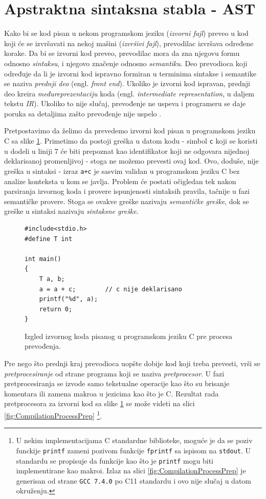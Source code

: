 \section{Apstraktna sintaksna stabla - AST}
\label{sec:AST}

Kako bi se kod pisan u nekom programskom jeziku (\emph{izvorni fajl}) preveo u kod koji će se izvršavati na nekoj mašini (\emph{izvršivi fajl}), prevodilac izvršava određene korake. Da bi se izvorni kod preveo, prevodilac mora da zna njegovu formu odnosno \emph{sintaksu}, i njegovo značenje odnosno \emph{semantiku}. Deo prevodioca koji određuje da li je izvorni kod ispravno formiran u terminima sintakse i semantike se naziva \emph{prednji deo} (engl. \emph{front end}). Ukoliko je izvorni kod ispravan, prednji deo kreira \emph{međureprezentaciju} koda (engl. \emph{intermediate representation}, u daljem tekstu \emph{IR}). Ukoliko to nije slučaj, prevođenje ne uspeva i programeru se daje poruka sa detaljima zašto prevođenje nije uspelo \cite{EngineeringCompilers}.

Pretpostavimo da želimo da prevedemo izvorni kod pisan u programskom jeziku C sa slike \ref{fig:CompilationProcessInit}. Primetimo da postoji greška u datom kodu - simbol \texttt{c} koji se koristi u dodeli u liniji $7$ će biti prepoznat kao identifikator koji ne odgovara nijednoj deklarisanoj promenljivoj - stoga ne možemo prevesti ovaj kod. Ovo, doduše, nije greška u sintaksi - izraz \texttt{a+c} je sasvim validan u programskom jeziku C bez analize konteksta u kom se javlja. Problem će postati očigledan tek nakon parsiranja izvornog koda i provere ispunjenosti sintaksih pravila, tačnije u fazi semantičke provere. Stoga se ovakve greške nazivaju \emph{semantičke greške}, dok se greške u sintaksi nazivaju \emph{sintaksne greške}.

\begin{figure}[h!]
\begin{lstlisting}
#include<stdio.h>
#define T int

int main()
{
    T a, b;
    a = a + c;        // c nije deklarisano
    printf("%d", a);
    return 0;
}
\end{lstlisting}
\caption{Izgled izvornog koda pisanog u programskom jeziku C pre procesa prevođenja.}
\label{fig:CompilationProcessInit}
\end{figure}

Pre nego što prednji kraj prevodioca uopšte dobije kod koji treba prevesti, vrši se \emph{pretprocesiranje} od strane programa koji se naziva \emph{pretprocesor}. U fazi pretprocesiranja se izvode samo tekstualne operacije kao što su brisanje komentara ili zamena makroa u jezicima kao što je C. Rezultat rada pretprocesora za izvorni kod sa slike \ref{fig:CompilationProcessInit} se može videti na slici \ref{fig:CompilationProcessPrep} 
\footnote{U nekim implementacijama C standardne biblioteke, moguće je da se poziv funckije \texttt{printf} zameni pozivom funkcije \texttt{fprintf} sa ispisom na \texttt{stdout}. U standardu se propisuje da funkcije kao što je \texttt{printf} mogu biti implementirane kao makroi. Izlaz na slici \ref{fig:CompilationProcessPrep} je generisan od strane \texttt{GCC 7.4.0} po C11 standardu i ovo nije slučaj u datom okruženju.}.

